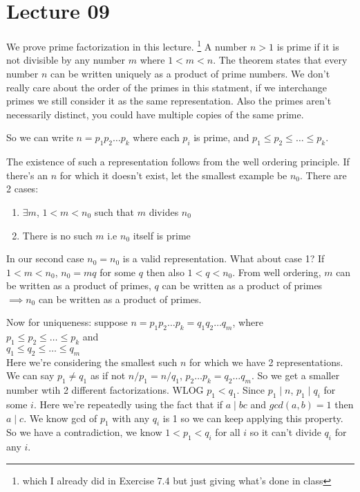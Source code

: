 \documentclass[a4paper,10pt]{article}
\theoremstyle{definition} %
\begin{document}
    \section{Lecture 09}

    We prove prime factorization in this lecture. 
    \footnote{which I already did in Exercise 7.4 but just giving what's done in class}
    A number $n>1$ is prime if it is not divisible by any number $m$ where $1 < m < n$.
    The theorem states that every number $n$ can be written uniquely as a product of prime numbers.
    We don't really care about the order of the primes in this statment, if we interchange
    primes we still consider it as the same representation. Also the primes aren't necessarily
    distinct, you could have multiple copies of the same prime. 

    So we can write $n = p_1p_2 \dots p_k$ where each $p_i$ is prime, and 
    $p_1 \leq p_2 \leq \dots \leq p_k$.

    The existence of such a representation follows from the well ordering principle.
    If there's an $n$ for which it doesn't exist, let the smallest example be $n_0$.
    There are 2 cases:
    \newpage
    \begin{enumerate}
        \item $\exists m$, $1 < m < n_0$ such that $m$ divides $n_0$
        \item There is no such $m$ i.e $n_0$ itself is prime
    \end{enumerate}        

    In our second case $n_0 = n_0$ is a valid representation. What about case 1?
    If $1 < m < n_0$, $n_0 = mq$ for some $q$ then also $1 < q < n_0$. From well
    ordering, $m$ can be written as a product of primes, $q$ can be written as 
    a product of primes $\implies n_0$ can be written as a product of primes.
    
    Now for uniqueness: suppose $n = p_1p_2 \dots p_k = q_1q_2 \dots q_m$, where \\
    $p_1 \leq p_2 \leq \dots \leq p_k$ and \\
    $q_1 \leq q_2 \leq \dots \leq q_m$ \\
    Here we're considering the smallest such $n$ for which we have 2 representations.
    We can say $p_1 \neq q_1$ as if not $n / p_1 = n / q_1$, $p_2 \dots p_k = q_2 \dots q_m$.
    So we get a smaller number wtih 2 different factorizations. WLOG $p_1 < q_1$. Since
    $p_1 \mid n$, $p_1 \mid q_i$ for some $i$. Here we're repeatedly using the fact that 
    if $a \mid bc$ and $gcd(a,b) = 1$ then $a \mid c$. We know gcd of $p_1$ with any $q_i$
    is 1 so we can keep applying this property. So we have a contradiction, we know $1 < p_1 < q_i$
    for all $i$ so it can't divide $q_i$ for any $i$.
\end{document}
